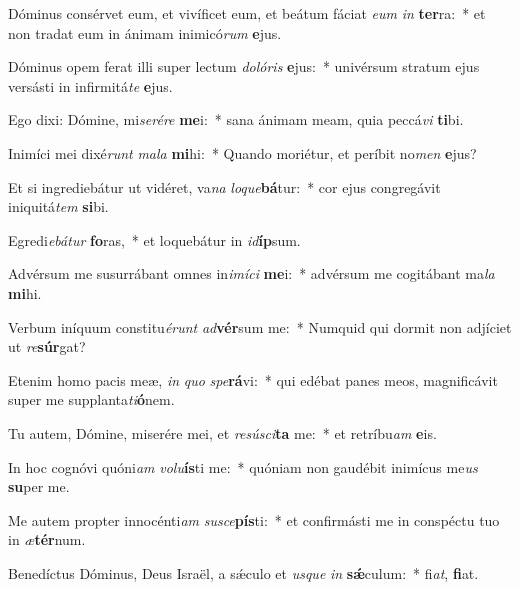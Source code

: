\item Dóminus consérvet eum, et vivíficet eum, et beátum fáciat \textit{e}\textit{um} \textit{in} \textbf{ter}ra:~* et non tradat eum in ánimam inimicó\textit{rum} \textbf{e}jus.
\item Dóminus opem ferat illi super lectum \textit{do}\textit{ló}\textit{ris} \textbf{e}jus:~* univérsum stratum ejus versásti in infirmitá\textit{te} \textbf{e}jus.
\item Ego dixi: Dómine, mi\textit{se}\textit{ré}\textit{re} \textbf{me}i:~* sana ánimam meam, quia peccá\textit{vi} \textbf{ti}bi.
\item Inimíci mei dixé\textit{runt} \textit{ma}\textit{la} \textbf{mi}hi:~* Quando moriétur, et períbit no\textit{men} \textbf{e}jus?
\item Et si ingrediebátur ut vidéret, va\textit{na} \textit{lo}\textit{que}\textbf{bá}tur:~* cor ejus congregávit iniquitá\textit{tem} \textbf{si}bi.
\item Egredi\textit{e}\textit{bá}\textit{tur} \textbf{fo}ras,~* et loquebátur in \textit{id}\textbf{íp}sum.
\item Advérsum me susurrábant omnes in\textit{i}\textit{mí}\textit{ci} \textbf{me}i:~* advérsum me cogitábant ma\textit{la} \textbf{mi}hi.
\item Verbum iníquum constitu\textit{é}\textit{runt} \textit{ad}\textbf{vér}sum me:~* Numquid qui dormit non adjíciet ut \textit{re}\textbf{súr}gat?
\item Etenim homo pacis meæ, \textit{in} \textit{quo} \textit{spe}\textbf{rá}vi:~* qui edébat panes meos, magnificávit super me supplanta\textit{ti}\textbf{ó}nem.
\item Tu autem, Dómine, miserére mei, et \textit{re}\textit{sú}\textit{sci}\textbf{ta} me:~* et retríbu\textit{am} \textbf{e}is.
\item In hoc cognóvi quóni\textit{am} \textit{vo}\textit{lu}\textbf{ís}ti me:~* quóniam non gaudébit inimícus me\textit{us} \textbf{su}per me.
\item Me autem propter innocénti\textit{am} \textit{su}\textit{sce}\textbf{pís}ti:~* et confirmásti me in conspéctu tuo in \textit{æ}\textbf{tér}num.
\item Benedíctus Dóminus, Deus Israël, a sǽculo et \textit{us}\textit{que} \textit{in} \textbf{sǽ}culum:~* fi\textit{at}, \textbf{fi}at.
